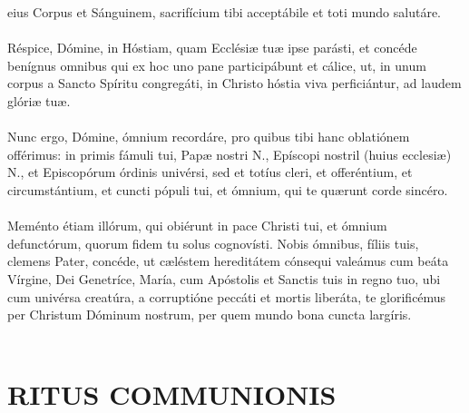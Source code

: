 \documentclass[12pt, a4paper]{article}
\begin{document}
	eius Corpus et Sánguinem,
	sacrifícium tibi acceptábile et toti
	mundo salutáre.
	\\\\
	Réspice, Dómine, in Hóstiam,
	quam Ecclésiæ tuæ ipse parásti, et
	concéde benígnus omnibus qui ex
	hoc uno pane participábunt et
	cálice, ut, in unum corpus a Sancto
	Spíritu congregáti, in Christo hóstia
	viva perficiántur, ad laudem glóriæ
	tuæ.
	\\\\
	Nunc ergo, Dómine, ómnium
	recordáre, pro quibus tibi hanc
	oblatiónem offérimus: in primis
	fámuli tui, Papæ nostri N.,
	Epíscopi nostril (huius ecclesiæ) N.,
	et Episcopórum órdinis univérsi,
	sed et totíus cleri, et offeréntium, et circumstántium, et cuncti pópuli
	tui, et ómnium, qui te quærunt
	corde sincéro.
	\\\\
	Meménto étiam illórum, qui
	obiérunt in pace Christi tui, et
	ómnium defunctórum, quorum
	fidem tu solus cognovísti. Nobis
	ómnibus, fíliis tuis, clemens Pater,
	concéde, ut cæléstem hereditátem
	cónsequi valeámus cum beáta
	Vírgine, Dei Genetríce, María, cum
	Apóstolis et Sanctis tuis in regno
	tuo, ubi cum univérsa creatúra, a
	corruptióne peccáti et mortis
	liberáta, te glorificémus per
	Christum Dóminum nostrum, per
	quem mundo bona cuncta largíris.
	\\\\
	
	\newpage
	
	\section*{RITUS COMMUNIONIS}
	
\end{document}
